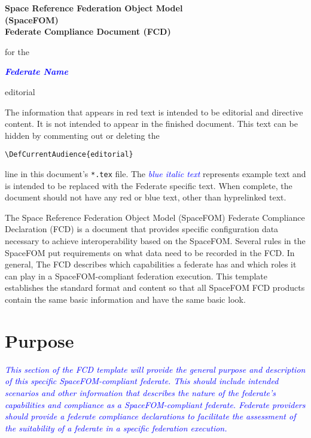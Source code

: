 \documentclass[11pt,english,letterpaper]{article}
\newcommand{\example}[1]{{\textcolor{blue}{\textit{#1}}}}
\begin{document}
\begin{center}
\begin{LARGE}
{\bfseries Space Reference Federation Object Model\\
(SpaceFOM)\\
Federate Compliance Document (FCD)}\\
\vspace{10pt}
\end{LARGE}
{\normalsize for the}\\
\vspace{10pt}
\begin{LARGE}
{\bfseries \example{\textlangle{}Federate Name\textrangle{}}}
\end{LARGE}
\end{center}

\begin{shownto}{editorial}
{\color{red} The information that appears in red text is intended
to be editorial and directive content.  It is not intended to appear in the
finished document.  This text can be hidden by commenting out or deleting the

\texttt{\textbackslash DefCurrentAudience\{editorial\}}

line in this document's \texttt{*.tex} file.  The \example{blue italic text}
represents example text and is intended to be replaced with the Federate
specific text.  When complete, the document should not have any red
or {\color{blue}blue} text, other than hyprelinked text.

The Space Reference Federation Object Model (SpaceFOM) Federate Compliance
Declaration (FCD) is a document that provides specific configuration data
necessary to achieve interoperability based on the SpaceFOM. Several rules
in the SpaceFOM put requirements on what data need to be recorded in the FCD.
In general, The FCD describes which capabilities a federate has and which roles
it can play in a SpaceFOM-compliant federation execution. This template
establishes the standard format and content so that all SpaceFOM FCD products
contain the same basic information and have the same basic look.}
\end{shownto}


\section*{Purpose}

\example{ This section of the FCD template will provide the general purpose and
description of this specific SpaceFOM-compliant federate. This should include
intended scenarios and other information that describes the nature of the
federate's capabilities and compliance as a SpaceFOM-compliant federate.
Federate providers should provide a federate compliance declarations to
facilitate the assessment of the suitability of a federate in a specific
federation execution. \cite{IEEE1516:FRAMEWORK,IEEE1516:API,IEEE1516:OMT}}
\end{document}
